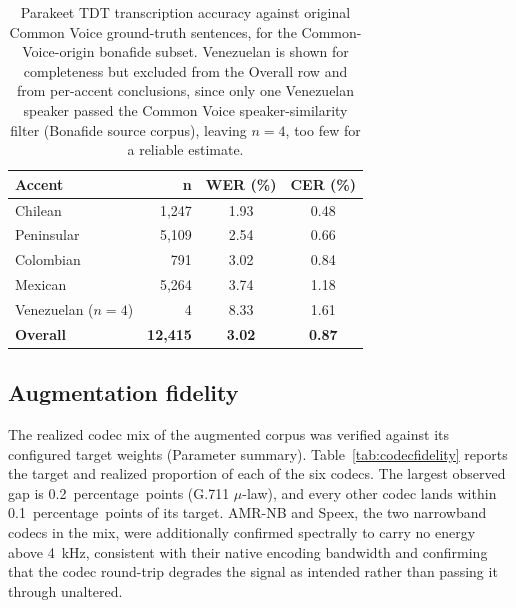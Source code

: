 \documentclass[11pt]{article}
\begin{document}
\begin{table}[H]
\centering
\caption{Parakeet TDT transcription accuracy against original Common
Voice ground-truth sentences, for the Common-Voice-origin bonafide
subset. Venezuelan is shown for completeness but excluded from the
Overall row and from per-accent conclusions, since only one Venezuelan
speaker passed the Common Voice speaker-similarity filter (Bonafide
source corpus), leaving $n=4$, too few for a reliable estimate.}
\label{tab:parakeetwer}
\small
\begin{tabular}{lrcc}
\toprule
\textbf{Accent} & \textbf{n} & \textbf{WER (\%)} & \textbf{CER (\%)} \\
\midrule
Chilean       &  1{,}247 & 1.93 & 0.48 \\
Peninsular    &  5{,}109 & 2.54 & 0.66 \\
Colombian     &    791 & 3.02 & 0.84 \\
Mexican       &  5{,}264 & 3.74 & 1.18 \\
Venezuelan ($n{=}4$) &   4 & 8.33 & 1.61 \\
\midrule
\textbf{Overall} & \textbf{12{,}415} & \textbf{3.02} & \textbf{0.87} \\
\bottomrule
\end{tabular}
\end{table}

\FloatBarrier
\subsection*{Augmentation fidelity}

The realized codec mix of the augmented corpus was verified against its
configured target weights (Parameter summary).
Table~\ref{tab:codecfidelity} reports the target and realized proportion
of each of the six codecs. The largest observed gap is
\SI{0.2}{percentage points} (G.711 $\mu$-law), and every other codec lands
within \SI{0.1}{percentage points} of its target. AMR-NB and Speex, the
two narrowband codecs in the mix, were additionally confirmed
spectrally to carry no energy above \SI{4}{\kilo\hertz}, consistent
with their native encoding bandwidth and confirming that the codec
round-trip degrades the signal as intended rather than passing it
through unaltered.
\end{document}

